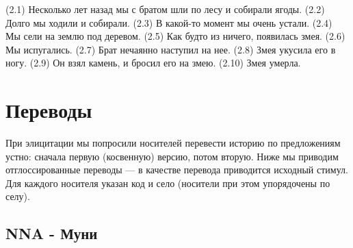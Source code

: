 \begin{appendices}
(2.1) Несколько лет назад мы с братом шли по лесу и собирали ягоды. (2.2) Долго мы ходили и собирали. (2.3) В какой-то момент мы очень устали. (2.4) Мы сели на землю под деревом. (2.5) Как будто из ничего, появилась змея. (2.6) Мы испугались. (2.7) Брат нечаянно наступил на нее. (2.8) Змея укусила его в ногу. (2.9) Он взял камень, и бросил его на змею. (2.10) Змея умерла. 

\section{Переводы}

При элицитации мы попросили носителей перевести историю по предложениям устно: сначала первую (косвенную) версию, потом вторую. Ниже мы приводим отглоссированные переводы --- в качестве перевода приводится исходный стимул. Для каждого носителя указан код и село (носители при этом упорядочены по селу).

\subsection{NNA - Муни}







\end{appendices}

